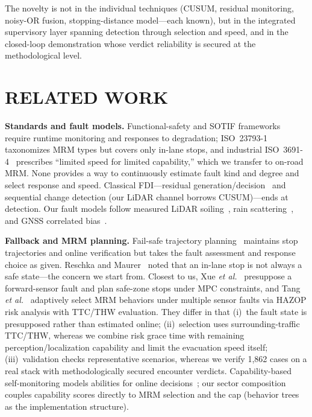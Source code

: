 \documentclass[letterpaper, 10pt, conference]{ieeeconf}
\begin{document}
The novelty is not in the individual techniques (CUSUM, residual monitoring,
noisy-OR fusion, stopping-distance model---each known), but in the
integrated supervisory layer spanning detection through selection and speed,
and in the closed-loop demonstration whose verdict reliability is secured at
the methodological level.

\section{RELATED WORK}

\textbf{Standards and fault models.} Functional-safety and SOTIF
frameworks \cite{iso26262,iso21448,j3016} require runtime monitoring and
responses to degradation; ISO~23793-1~\cite{iso23793} taxonomizes MRM
types but covers only in-lane stops, and industrial
ISO~3691-4~\cite{iso3691} prescribes ``limited speed for limited
capability,'' which we transfer to on-road MRM. None provides a way to
continuously estimate fault kind and degree and select response and speed.
Classical FDI---residual generation/decision~\cite{isermann} and
sequential change detection (our LiDAR channel borrows CUSUM)---ends at
detection. Our fault models follow measured LiDAR soiling~\cite{trierweiler},
rain scattering~\cite{goodin}, and GNSS correlated bias~\cite{langel}.

\textbf{Fallback and MRM planning.} Fail-safe trajectory
planning~\cite{pek} maintains stop trajectories and online verification but
takes the fault assessment and response choice as given. Reschka and Maurer~\cite{reschka2015safe} noted that an in-lane stop is
not always a safe state---the concern we start from. Closest to us, Xue
\emph{et al.}~\cite{xue2018} presuppose a forward-sensor fault and plan
safe-zone stops under MPC constraints, and Tang \emph{et al.}~\cite{tang}
adaptively select MRM behaviors under multiple sensor faults via HAZOP
risk analysis with TTC/THW evaluation. They differ in that
(i)~the fault state is presupposed rather than estimated online;
(ii)~selection uses surrounding-traffic TTC/THW, whereas we combine risk
grace time with remaining perception/localization capability and limit the
evacuation speed itself; (iii)~validation checks representative scenarios,
whereas we verify 1{,}862 cases on a real stack with methodologically
secured encounter verdicts. Capability-based self-monitoring models abilities for online
decisions~\cite{reschka2015ability}; our sector composition couples
capability scores directly to MRM selection and the cap (behavior trees as the
implementation structure).
\end{document}
